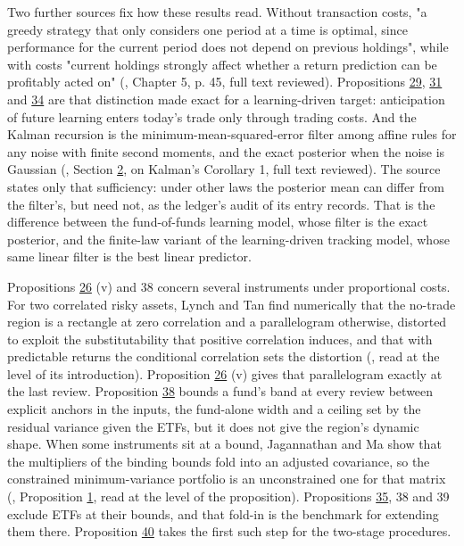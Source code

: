 \documentclass[11pt]{article}
\begin{document}
Two further sources fix how these results read. Without transaction
costs, "a greedy strategy that only considers one period at a time is
optimal, since performance for the current period does not depend on
previous holdings", while with costs "current holdings strongly affect
whether a return prediction can be profitably acted on"
(\cite{boyd2017multiperiod}, Chapter 5, p. 45, full text reviewed).
Propositions \hyperref[res:Proposition-29]{29}, \hyperref[res:Proposition-31]{31} and \hyperref[res:Proposition-34]{34} are that distinction made exact for a
learning-driven target: anticipation of future learning enters today's
trade only through trading costs. And the Kalman recursion is the
minimum-mean-squared-error filter among affine rules for any noise
with finite second moments, and the exact posterior when the noise is
Gaussian (\cite{uhlmann2022gaussianity}, Section \hyperref[sec:2]{2}, on Kalman's Corollary
1, full text reviewed). The source states only that sufficiency: under
other laws the posterior mean can differ from the filter's, but need
not, as the ledger's audit of its entry records. That is the difference
between the fund-of-funds learning model, whose filter is the exact
posterior, and the finite-law variant of the learning-driven tracking
model, whose same linear filter is the best linear predictor.

Propositions \hyperref[res:Proposition-26]{26} (v) and 38 concern several instruments under
proportional costs. For two correlated risky assets, Lynch and Tan find
numerically that the no-trade region is a rectangle at zero
correlation and a parallelogram otherwise, distorted to exploit the
substitutability that positive correlation induces, and that with
predictable returns the conditional correlation sets the distortion
(\cite{lynchtan2010multiple}, read at the level of its introduction).
Proposition \hyperref[res:Proposition-26]{26} (v) gives that parallelogram exactly at the last review.
Proposition \hyperref[res:Proposition-38]{38} bounds a fund's band at every review between explicit
anchors in the inputs, the fund-alone width and a ceiling set by the
residual variance given the ETFs, but it does not give the region's
dynamic shape. When some instruments sit at a bound, Jagannathan and
Ma show that the multipliers of the binding bounds fold into an
adjusted covariance, so the constrained minimum-variance portfolio is
an unconstrained one for that matrix (\cite{jagannathan2003risk},
Proposition \hyperref[res:Proposition-1]{1}, read at the level of the proposition). Propositions \hyperref[res:Proposition-35]{35},
38 and 39 exclude ETFs at their bounds, and that fold-in is the
benchmark for extending them there. Proposition \hyperref[res:Proposition-40]{40} takes the first
such step for the two-stage procedures.
\end{document}
